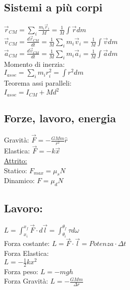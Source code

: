 \documentclass[8pt]{scrreprt}
\begin{document}
\begin{multicols*}{3}
\vspace{-3mm}
\subsection*{Sistemi a più corpi}
$\overrightarrow{r}_{CM} = \sum_i \frac{m_i \overrightarrow{r}_i}{M} = \frac{1}{M} \int \overrightarrow{r} dm$\\
$\overrightarrow{v}_{CM} = \frac{d\overrightarrow{r}_{CM}}{dt} = \frac{1}{M} \sum_i m_i \overrightarrow{v}_i = \frac{1}{M} \int \overrightarrow{v} dm$\\
$\overrightarrow{a}_{CM} = \frac{d\overrightarrow{v}_{CM}}{dt} = \frac{1}{M} \sum_i m_i \overrightarrow{a}_i = \frac{1}{M} \int \overrightarrow{a} dm$\\
Momento di inerzia:\\
$I_{asse} = \sum_i m_i r_i^2 = \int r^2 dm$\\
Teorema assi paralleli:\\
$I_{asse} = I_{CM} + Md^2$

\vspace{-3mm}
\subsection*{Forze, lavoro, energia}
Gravità: $\overrightarrow{F} = -\frac{GMm}{r^2}\hat{r}$\\
Elastica: $\overrightarrow{F} = -k\overrightarrow{x}$\\
\underline{Attrito:}\\
Statico: $F_{max} = \mu_s N$\\
Dinamico: $F = \mu_d N$\\
\subsection*{Lavoro:}
$L=\int_{x_i}^{x_f} \overrightarrow{F} \cdot d\overrightarrow{l}= \int_{\theta_i}^{\theta_f} \tau d \omega$\\
Forza costante: $L = \overrightarrow{F} \cdot \overrightarrow{l}= Potenza \cdot\Delta t$\\
Forza Elastica:\\
$L=-\frac{1}{2} k x^2$\\
Forza peso: $L = -mgh$\\
Forza Gravità: $L = -\frac{GMm}{\Delta r}$

\vspace{-3mm}

\end{multicols*}
\end{document}
